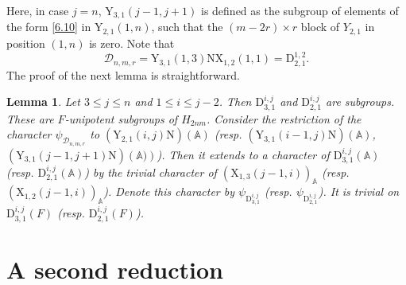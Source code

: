 \documentclass[12pts]{amsart}
\newcommand{\BA}{{\mathbb {A}}}
\newtheorem{lem}[thm]{Lemma}
\begin{document}
Here, in case $j=n$, $\mathrm{Y}_{3,1}(j-1,j+1)$ is defined as
the subgroup of elements of the form
\eqref{6.10} in $\mathrm{Y}_{2,1}(1,n)$, such that the $(m-2r)\times r$
block of $Y_{2,1}$ in position $(1,n)$ is zero. Note that
\begin{equation}\label{6.13}
\mathcal{D}_{n,m,r}=\mathrm{Y}_{3,1}(1,3)\mathrm{N}\mathrm{X}_{1,2}(1,1)=\mathrm{D}_{2,1}^{1,2}.
\end{equation}
The proof of the next lemma is straightforward.
\begin{lem}\label{lem 6.1}
	Let $3\leq j\leq n$ and $1\leq i\leq j-2$. Then
	$\mathrm{D}_{3,1}^{i,j}$ and $\mathrm{D}_{2,1}^{i,j}$ are subgroups.
	These are $F$-unipotent subgroups of $H_{2nm}$. Consider the
	restriction of the character $\psi_{\mathcal{D}_{n,m,r}}$ to
	$(\mathrm{Y}_{2,1}(i,j)\mathrm{N})({\BA})$
	(resp. $(\mathrm{Y}_{3,1}(i-1,j)\mathrm{N})({\BA})$,
	$(\mathrm{Y}_{3,1}(j-1,j+1)\mathrm{N})({\BA)})$). Then it extends
	to a character of $\mathrm{D}_{3,1}^{i,j}(\BA)$ (resp.
	$\mathrm{D}_{2,1}^{i,j}(\BA)$) by the trivial character of
	$(\mathrm{X}_{1,3}(j-1,i))_{\BA}$ (resp.
	$(\mathrm{X}_{1,2}(j-1,i))_{\BA}$). Denote this character by
	$\psi_{\mathrm{D}_{3,1}^{i,j}}$ (resp.
	$\psi_{\mathrm{D}_{2,1}^{i,j}}$). It is trivial on
	$\mathrm{D}_{3,1}^{i,j}(F)$ (resp. $\mathrm{D}_{2,1}^{i,j}(F)$).
\end{lem}


\section{A second reduction}
\end{document}
